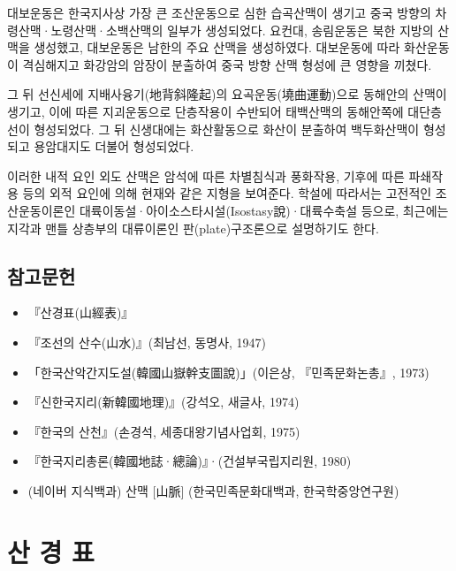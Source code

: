 \documentclass[12pt,a4paper]{book}
\newcommand{\SectionMargin}			{\newpage  \null \vskip 0cm}
\begin{document}
대보운동은 한국지사상 가장 큰 조산운동으로 심한 습곡산맥이 생기고 중국 방향의 차령산맥·노령산맥·소백산맥의 일부가 생성되었다. 요컨대, 송림운동은 북한 지방의 산맥을 생성했고, 대보운동은 남한의 주요 산맥을 생성하였다. 대보운동에 따라 화산운동이 격심해지고 화강암의 암장이 분출하여 중국 방향 산맥 형성에 큰 영향을 끼쳤다.

그 뒤 선신세에 지배사융기(地背斜隆起)의 요곡운동(墝曲運動)으로 동해안의 산맥이 생기고, 이에 따른 지괴운동으로 단층작용이 수반되어 태백산맥의 동해안쪽에 대단층선이 형성되었다. 그 뒤 신생대에는 화산활동으로 화산이 분출하여 백두화산맥이 형성되고 용암대지도 더불어 형성되었다.

이러한 내적 요인 외도 산맥은 암석에 따른 차별침식과 풍화작용, 기후에 따른 파쇄작용 등의 외적 요인에 의해 현재와 같은 지형을 보여준다. 학설에 따라서는 고전적인 조산운동이론인 대륙이동설·아이소스타시설(Isostasy說)·대륙수축설 등으로, 최근에는 지각과 맨틀 상층부의 대류이론인 판(plate)구조론으로 설명하기도 한다.

		\newpage  \null
		\subsection{참고문헌}
		\null

		\begin{itemize}[itemsep=0.0em]
		\item	『산경표(山經表)』
		\item	『조선의 산수(山水)』(최남선, 동명사, 1947)
		\item	「한국산악간지도설(韓國山嶽幹支圖說)」(이은상, 『민족문화논총』, 1973)
		\item	『신한국지리(新韓國地理)』(강석오, 새글사, 1974)
		\item	『한국의 산천』(손경석, 세종대왕기념사업회, 1975)
		\item	『한국지리총론(韓國地誌·總論)』·(건설부국립지리원, 1980)
		\item	(네이버 지식백과) 산맥 [山脈] (한국민족문화대백과, 한국학중앙연구원)
		\end{itemize}







	\SectionMargin
	\section{산 경 표}
	\null
\end{document}
